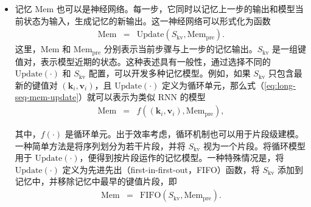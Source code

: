 \begin{itemize}
    \noindent 这里，$\{\beta_1,\cdots,\beta_{n_c}\}$ 为系数，既可以作为模型参数学习，也可以通过启发式方法确定。例如，可以将其设置为递增系数，即 $\beta_{1} < \beta_{2} < \cdots < \beta_{n_c -1} < \beta_{n_c}$，使更接近 $i$ 的位置获得更大权重。还可以将移动平均扩展到截至 $i$ 的全部位置，从而得到键和值的累积平均，形式为
    \begin{eqnarray}
    \mathrm{Mem} & = & \left( \frac{\sum_{j=0}^{i} \mathbf{k}_j}{i+1}, \frac{\sum_{j=0}^{i} \mathbf{v}_j}{i+1} \right).
    \end{eqnarray}

    一般而言，累积平均可以写成递归形式
    \begin{eqnarray}
    \mathrm{Mem}_{i} & = & \frac{(\mathbf{k}_i,\mathbf{v}_i) + i \cdot \mathrm{Mem}_{i-1}}{i + 1},
    \end{eqnarray}

    \noindent 其中，$\mathrm{Mem}_{i}$ 和 $\mathrm{Mem}_{i-1}$ 分别表示当前位置与前一位置的累积平均。这种模型的优点是，推理时只需存储单个键值对，无须存储所有键值对。需要注意，上述记忆模型与循环模型有关；研究者还使用了更先进的技术，开发 Transformer 自注意力机制的替代方案~\cite{ma-etal:2023mega}。

\item \vspace{0.3em} 记忆 $\mathrm{Mem}$ 也可以是神经网络。每一步，它同时以记忆上一步的输出和模型当前状态为输入，生成记忆的新输出。这一神经网络可以形式化为函数
    \begin{eqnarray}
    \mathrm{Mem} & = & \mathrm{Update}(S_{\mathrm{kv}}, \mathrm{Mem}_{\mathrm{pre}}) \label{eq:long-seq-mem-update}.
    \end{eqnarray}
    \noindent 这里，$\mathrm{Mem}$ 和 $\mathrm{Mem}_{\mathrm{pre}}$ 分别表示当前步骤与上一步的记忆输出。$S_{\mathrm{kv}}$ 是一组键值对，表示模型近期的状态。这种表述具有一般性，通过选择不同的 $\mathrm{Update}(\cdot)$ 和 $S_{\mathrm{kv}}$ 配置，可以开发多种记忆模型。例如，如果 $S_{\mathrm{kv}}$ 只包含最新的键值对 $(\mathbf{k}_i,\mathbf{v}_i)$，且 $\mathrm{Update}(\cdot)$ 定义为循环单元，那么式（\ref{eq:long-seq-mem-update}）就可以表示为类似 RNN 的模型
    \begin{eqnarray}
    \mathrm{Mem} & = & f((\mathbf{k}_i,\mathbf{v}_i), \mathrm{Mem}_{\mathrm{pre}}),
    \end{eqnarray}

    \noindent 其中，$f(\cdot)$ 是循环单元。出于效率考虑，循环机制也可以用于片段级建模。一种简单方法是将序列划分为若干片段，并将 $S_{\mathrm{kv}}$ 视为一个片段。将循环模型用于 $\mathrm{Update}(\cdot)$，便得到按片段运作的记忆模型。一种特殊情况是，将 $\mathrm{Update}(\cdot)$ 定义为先进先出（first-in-first-out，FIFO）函数，将 $S_{\mathrm{kv}}$ 添加到记忆中，并移除记忆中最早的键值片段，即
    \begin{eqnarray}
    \mathrm{Mem} & = & \mathrm{FIFO}(S_{\mathrm{kv}}, \mathrm{Mem}_{\mathrm{pre}}).
    \end{eqnarray}


\end{itemize}
